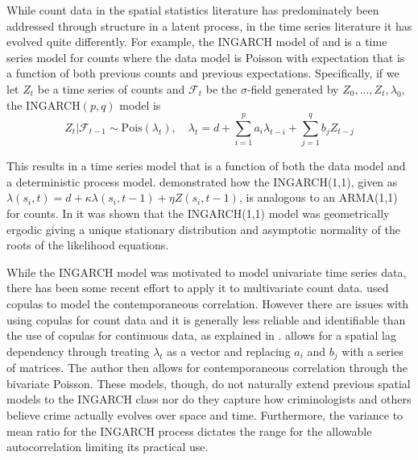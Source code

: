\documentclass[11pt]{isuthesis}
\begin{document}
While count data in the spatial statistics literature has predominately been addressed through structure in a latent process, in the time series literature it has evolved quite differently.  For example, the INGARCH model of \cite{ferland2006integer} and \cite{heinen2003modelling} is a time series model for counts where the data model is Poisson with expectation that is a function of both previous counts and previous expectations.  Specifically, if we let ${Z_t}$ be a time series of counts and $\mathcal{F}_t$ be the $\sigma$-field generated by ${Z_0,...,Z_t,\lambda_0}$, the INGARCH$(p,q)$ model is
\begin{equation}
	Z_t|\mathcal{F}_{t-1}\sim \mbox{Pois}(\lambda_t),\quad \lambda_t=d + \sum_{i=1}^p a_i \lambda_{t-i}+\sum_{j=1}^q b_j Z_{t-j}\label{eq:INGARCH}
\end{equation}

This results in a time series model that is a function of both the data model and a deterministic process model.  \cite{ferland2006integer} demonstrated how the INGARCH(1,1), given as $\lambda(s_i,t)=d+\kappa \lambda(s_i,t-1)+\eta Z(s_i,t-1)$, is analogous to an ARMA(1,1) for counts.  In \cite{fokianos2009poisson} it was shown that the INGARCH(1,1) model was geometrically ergodic giving a unique stationary distribution and asymptotic normality of the roots of the likelihood equations.

While the INGARCH model was motivated to model univariate time series data, there has been some recent effort to apply it to multivariate count data.  \cite{heinen2007multivariate} used copulas to model the contemporaneous correlation.  However there are issues with using copulas for count data and it is generally less reliable and identifiable than the use of copulas for continuous data, as explained in \cite{genest2007primer}.  \cite{liu2012some} allows for a spatial lag dependency through treating $\lambda_t$ as a vector and replacing $a_i$ and $b_j$ with a series of matrices.  The author then allows for contemporaneous correlation through the bivariate Poisson.  These models, though, do not naturally extend previous spatial models to the INGARCH class nor do they capture how criminologists and others believe crime actually evolves over space and time.  Furthermore, the variance to mean ratio for the INGARCH process dictates the range for the allowable autocorrelation limiting its practical use.
\end{document}
